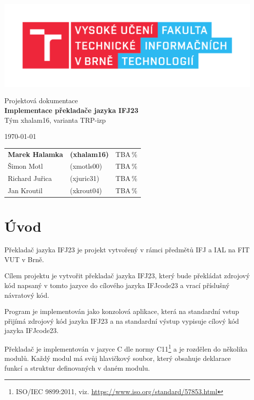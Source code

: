 \documentclass[a4paper, 11pt]{article}
\begin{document}
\begin{titlepage}
		\begin{center}
			\includegraphics[width=0.77\linewidth]{include/FIT_logo.pdf} \\


			\Huge{Projektová dokumentace} \\
			\LARGE{\textbf{Implementace překladače jazyka IFJ23}} \\
			\Large{Tým xhalam16, varianta TRP-izp}
		\end{center}

		\begin{minipage}{0.4 \textwidth}
			{\Large \today}
		\end{minipage}
		\hfill
		\begin{minipage}[r]{0.6 \textwidth}
			\Large
			\begin{tabular}{l l l}
				\textbf{Marek Halamka} & \textbf{(xhalam16)} & \quad TBA\,\% \\
				Šimon Motl & (xmotls00) & \quad TBA\,\% \\
				Richard Juřica & (xjuric31) & \quad TBA\,\% \\
				Jan Kroutil & (xkrout04) & \quad TBA\,\% \\
			\end{tabular}
		\end{minipage}
	\end{titlepage}
	\thispagestyle{empty}
	\tableofcontents

	\newpage
	\setcounter{page}{1}
	\section{Úvod}
	Překladač jazyka IFJ23 je projekt vytvořený v rámci předmětů IFJ a IAL na FIT VUT v Brně. 
	\par\noindent Cílem projektu je vytvořit překladač jazyka IFJ23, který bude překládat zdrojový kód napsaný v tomto jazyce do cílového jazyka IFJcode23 a vrací příslušný návratový kód.
	\par\noindent Program je implementován jako konzolová aplikace, která na standardní vstup přijímá zdrojový kód jazyka IFJ23 a na standardní výstup vypisuje cílový kód jazyka IFJcode23. 
	\par\noindent Překladač je implementován v jazyce C dle normy C11\footnote{ISO/IEC 9899:2011, viz. \url{https://www.iso.org/standard/57853.html}} a je rozdělen do několika modulů. Každý modul má svůj hlavičkový soubor, který obsahuje deklarace funkcí a struktur definovaných v daném modulu. 
\end{document}
